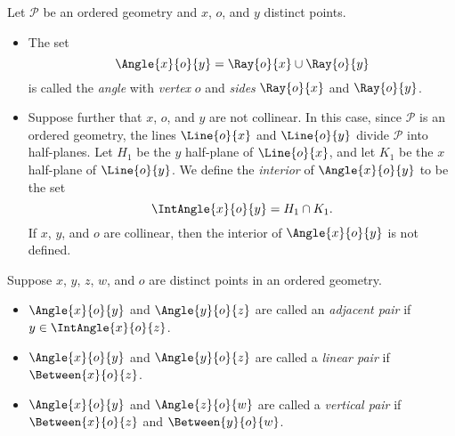 \documentclass{article}
\begin{document}

\begin{dfn}[Angle]
Let $\mathcal{P}$ be an ordered geometry and $x$, $o$, and $y$ distinct points.
\begin{itemize}
\item The set \[ \Angle{x}{o}{y} = \Ray{o}{x} \cup \Ray{o}{y} \] is called the \emph{angle} with \emph{vertex} $o$ and \emph{sides} $\Ray{o}{x}$ and $\Ray{o}{y}$.
\item Suppose further that $x$, $o$, and $y$ are not collinear. In this case, since $\mathcal{P}$ is an ordered geometry, the lines $\Line{o}{x}$ and $\Line{o}{y}$ divide $\mathcal{P}$ into half-planes. Let $H_1$ be the $y$ half-plane of $\Line{o}{x}$, and let $K_1$ be the $x$ half-plane of $\Line{o}{y}$. We define the \emph{interior} of $\Angle{x}{o}{y}$ to be the set \[ \IntAngle{x}{o}{y} = H_1 \cap K_1. \] If $x$, $y$, and $o$ are collinear, then the interior of $\Angle{x}{o}{y}$ is not defined.
\end{itemize}
\end{dfn}



\begin{dfn}
Suppose $x$, $y$, $z$, $w$, and $o$ are distinct points in an ordered geometry.
\begin{itemize}
\item $\Angle{x}{o}{y}$ and $\Angle{y}{o}{z}$ are called an \emph{adjacent pair} if $y \in \IntAngle{x}{o}{z}$.
\item $\Angle{x}{o}{y}$ and $\Angle{y}{o}{z}$ are called a \emph{linear pair} if $\Between{x}{o}{z}$.
\item $\Angle{x}{o}{y}$ and $\Angle{z}{o}{w}$ are called a \emph{vertical pair} if $\Between{x}{o}{z}$ and $\Between{y}{o}{w}$.
\end{itemize}
\end{dfn}
\end{document}
